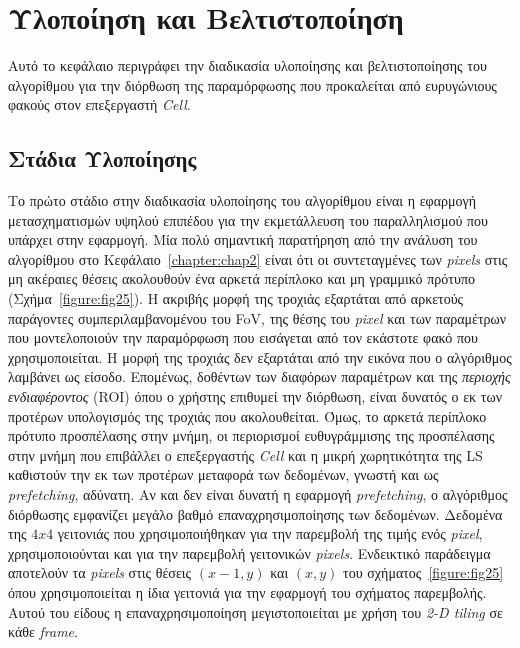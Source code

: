 ﻿\chapter{Υλοποίηση και Βελτιστοποίηση}
\label{chapter:chap4}

Αυτό το κεφάλαιο περιγράφει την διαδικασία υλοποίησης και βελτιστοποίησης του αλγορίθμου για την διόρθωση της παραμόρφωσης που προκαλείται από ευρυγώνιους φακούς στον επεξεργαστή \textsl{Cell}.

\section{Στάδια Υλοποίησης}
\label{section:sect41}
\indent
Το πρώτο στάδιο στην διαδικασία υλοποίησης του αλγορίθμου είναι η εφαρμογή μετασχηματισμών υψηλού επιπέδου για την εκμετάλλευση του παραλληλισμού που υπάρχει στην εφαρμογή. Μία πολύ σημαντική παρατήρηση από την ανάλυση του αλγορίθμου στο Κεφάλαιο~\ref{chapter:chap2} είναι ότι οι συντεταγμένες των \textsl{pixels} στις μη ακέραιες θέσεις ακολουθούν ένα αρκετά περίπλοκο και μη γραμμικό πρότυπο (Σχήμα~\ref{figure:fig25}). Η ακριβής μορφή της τροχιάς εξαρτάται από αρκετούς παράγοντες συμπεριλαμβανομένου του \ac{FoV}, της θέσης του \textsl{pixel} και των παραμέτρων που μοντελοποιούν την παραμόρφωση που εισάγεται από τον εκάστοτε φακό που χρησιμοποιείται. Η μορφή της τροχιάς δεν εξαρτάται από την εικόνα που ο αλγόριθμος λαμβάνει ως είσοδο.\newline \indent 
Επομένως, δοθέντων των διαφόρων παραμέτρων και της \textsl{περιοχής ενδιαφέροντος} (\ac{ROI}) όπου ο χρήστης επιθυμεί την διόρθωση, είναι δυνατός ο εκ των προτέρων υπολογισμός της τροχιάς που ακολουθείται. Όμως, το αρκετά περίπλοκο πρότυπο προσπέλασης στην μνήμη, οι περιορισμοί ευθυγράμμισης της προσπέλασης στην μνήμη που επιβάλλει ο επεξεργαστής \textsl{Cell} και η μικρή χωρητικότητα της \ac{LS} καθιστούν την εκ των προτέρων μεταφορά των δεδομένων, γνωστή και ως \textsl{prefetching}, αδύνατη.\newline \indent
Αν και δεν είναι δυνατή η εφαρμογή \textsl{prefetching}, ο αλγόριθμος διόρθωσης εμφανίζει μεγάλο βαθμό επαναχρησιμοποίησης των δεδομένων. Δεδομένα της \(4x4\) γειτονιάς που χρησιμοποιήθηκαν για την παρεμβολή της τιμής ενός \textsl{pixel}, χρησιμοποιούνται και για την παρεμβολή γειτονικών \textsl{pixels}. Ενδεικτικό παράδειγμα αποτελούν τα \textsl{pixels} στις θέσεις \((x-1, y)\) και \((x,y)\) του σχήματος~\ref{figure:fig25} όπου χρησιμοποιείται η ίδια γειτονιά για την εφαρμογή του σχήματος παρεμβολής. Αυτού του είδους η επαναχρησιμοποίηση μεγιστοποιείται με χρήση του \textsl{2-D tiling} σε κάθε \textsl{frame}.\newline \indent 
